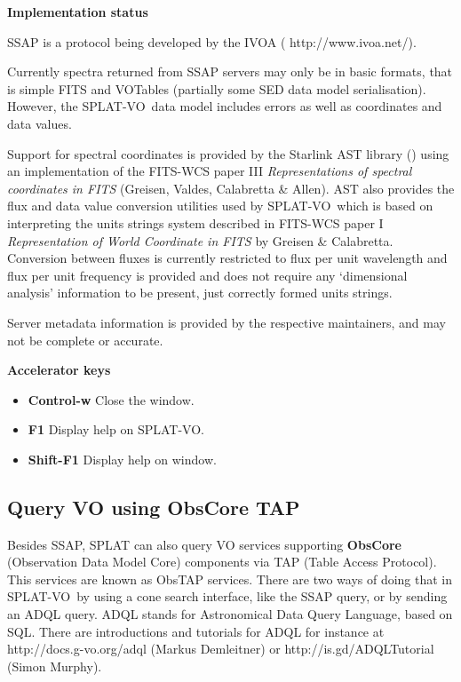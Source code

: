 \documentclass[twoside,11pt,nolof]{starlink}
\providecommand{\SPLAT}{\textsf{SPLAT-VO}}
\newcommand{\labelitem}[1]{\textbf{#1}}
\providecommand{\subheading}[1]{\textbf{\large{#1}}}
\begin{document}
\subheading{Implementation status}

SSAP is a protocol being developed by the IVOA
(
{http://www.ivoa.net/}).

Currently spectra returned from SSAP servers may only be in basic formats,
that is simple FITS and VOTables (partially some SED data model serialisation).
However, the \SPLAT\ data model includes errors as well as coordinates and
data values.

Support for spectral coordinates is provided by the Starlink AST library
() using an implementation of the FITS-WCS paper III
\textit{Representations of spectral coordinates in FITS}
(Greisen,
Valdes, Calabretta \& Allen).
AST also provides the flux and data value conversion utilities used by
\SPLAT\ which is based on interpreting the units strings system described
in FITS-WCS paper I \textit{Representation of World Coordinate in FITS}
by Greisen \& Calabretta.
Conversion between fluxes is currently restricted to flux per unit wavelength
and flux per unit frequency is provided and does not require any `dimensional
analysis' information to be present, just correctly formed units strings.

Server metadata information is provided by the respective maintainers, and may
not be complete or accurate.

\subheading{Accelerator keys}

\begin{itemize}
\item \labelitem{Control-w} Close the window.
\item \labelitem{F1} Display help on \SPLAT.
\item \labelitem{Shift-F1} Display help on window.
\end{itemize}

\newpage
\subsection{Query VO using ObsCore TAP}{}

Besides SSAP, SPLAT can also query VO services supporting \textbf{ObsCore }
(Observation Data Model Core) components via TAP (Table Access Protocol).
This services are known as ObsTAP services. There are two ways of doing that
in \SPLAT\, by using a cone search interface, like the SSAP query, or by sending an ADQL
query. ADQL stands for Astronomical Data Query Language, based on SQL. There
are introductions and tutorials for ADQL for instance at http://docs.g-vo.org/adql (Markus Demleitner)
or http://is.gd/ADQLTutorial (Simon Murphy).
\end{document}
